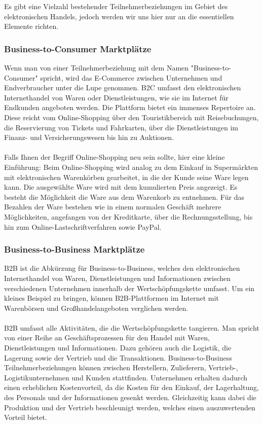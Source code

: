 \documentclass[11pt,a4paper]{article}
\begin{document}
\noindent Es gibt eine Vielzahl bestehender Teilnehmerbeziehungen im Gebiet des elektronischen Handels, jedoch werden wir uns hier nur an die essentiellen Elemente richten.
\subsubsection{Business-to-Consumer Marktplätze}

Wenn man von einer Teilnehmerbeziehung mit dem Namen "Business-to-Consumer" spricht, wird das E-Commerce zwischen Unternehmen und Endverbraucher unter die Lupe genommen. B2C umfasst den elektronischen Internethandel von Waren oder Dienstleistungen, wie sie im Internet für Endkunden angeboten werden. Die Plattform bietet ein immenses Repertoire an. Diese reicht vom Online-Shopping über den Touristikbereich mit Reisebuchungen, die Reservierung von Tickets und Fahrkarten, über die Dienstleistungen im Finanz- und Versicherungswesen bis hin zu Auktionen. \\ \\

\noindent Falls Ihnen der Begriff Online-Shopping neu sein sollte, hier eine kleine Einführung: Beim Online-Shopping wird analog zu dem Einkauf in Supermärkten mit elektronischen Warenkörben gearbeitet, in die der Kunde seine Ware legen kann. Die ausgewählte Ware wird mit dem kumulierten Preis angezeigt. Es besteht die Möglichkeit die Ware aus dem Warenkorb zu entnehmen. Für das Bezahlen der Ware bestehen wie in einem normalen Geschäft mehrere Möglichkeiten, angefangen von der Kreditkarte, über die Rechnungsstellung, bis hin zum Online-Lastschriftverfahren sowie PayPal.
\subsubsection{Business-to-Business Marktplätze}

B2B ist die Abkürzung für Business-to-Business, welches den elektronischen Internethandel von Waren, Dienstleistungen und Informationen zwischen verschiedenen Unternehmen innerhalb der Wertschöpfungskette umfasst. Um ein kleines Beispiel zu bringen, können B2B-Plattformen im Internet mit Warenbörsen und Großhandelangeboten verglichen werden. \\ \\

\noindent B2B umfasst alle Aktivitäten, die die Wertschöpfungskette tangieren. Man spricht von einer Reihe an Geschäftsprozessen für den Handel mit Waren, Dienstleistungen und Informationen. Dazu gehören auch die Logistik, die Lagerung sowie der Vertrieb und die Transaktionen. Business-to-Business Teilnehmerbeziehungen können zwischen Herstellern, Zulieferern, Vertrieb-, Logistikunternehmen und Kunden stattfinden. Unternehmen erhalten dadurch einen erheblichen Kostenvorteil, da die Kosten für den Einkauf, der Lagerhaltung, des Personals und der Informationen gesenkt werden. Gleichzeitig kann dabei die Produktion und der Vertrieb beschleunigt werden, welches einen auszuwertenden Vorteil bietet.
\end{document}
